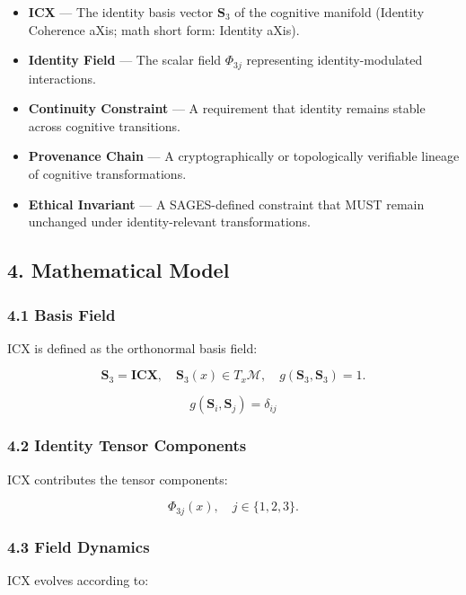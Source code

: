\begin{itemize}
\tightlist
\item
  \textbf{ICX} --- The identity basis vector \(\mathbf{S}_3\) of the cognitive manifold (Identity Coherence aXis; math short form: Identity aXis).
\item
  \textbf{Identity Field} --- The scalar field \(\Phi_{3j}\) representing identity-modulated interactions.
\item
  \textbf{Continuity Constraint} --- A requirement that identity remains stable across cognitive transitions.
\item
  \textbf{Provenance Chain} --- A cryptographically or topologically verifiable lineage of cognitive transformations.
\item
  \textbf{Ethical Invariant} --- A SAGES-defined constraint that MUST remain unchanged under identity-relevant transformations.
\end{itemize}

\subsection{4. Mathematical Model}\label{mathematical-model}

\subsubsection{4.1 Basis Field}\label{basis-field}

ICX is defined as the orthonormal basis field:

\[
\mathbf{S}_3 = \mathbf{ICX},\quad \mathbf{S}_3(x) \in T_x\mathcal{M}, \quad g(\mathbf{S}_3, \mathbf{S}_3) = 1.
\]

\[
g(\mathbf{S}_i,\mathbf{S}_j)=\delta_{ij}
\]

\subsubsection{4.2 Identity Tensor Components}\label{identity-tensor-components}

ICX contributes the tensor components:

\[
\Phi_{3j}(x), \quad j \in \{1,2,3\}.
\]

\subsubsection{4.3 Field Dynamics}\label{field-dynamics}

ICX evolves according to:

